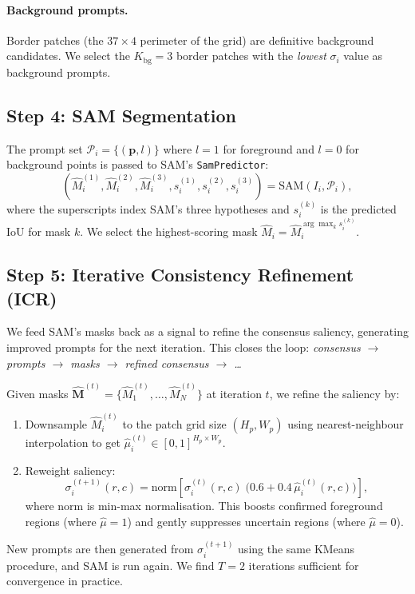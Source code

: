\documentclass[10pt,twocolumn,letterpaper]{article}
\begin{document}
\paragraph{Background prompts.}
Border patches (the $37 \times 4$ perimeter of the grid) are definitive
background candidates.
We select the $K_{\text{bg}} = 3$ border patches with the \emph{lowest}
$\sigma_i$ value as background prompts.

\subsection{Step 4: SAM Segmentation}

The prompt set $\mathcal{P}_i = \{(\mathbf{p}, l)\}$ where $l=1$ for
foreground and $l=0$ for background points is passed to SAM's
\texttt{SamPredictor}:
\begin{equation}
  (\hat{M}_i^{(1)}, \hat{M}_i^{(2)}, \hat{M}_i^{(3)}, s_i^{(1)}, s_i^{(2)}, s_i^{(3)})
  = \text{SAM}(I_i, \mathcal{P}_i),
\end{equation}
where the superscripts index SAM's three hypotheses and $s_i^{(k)}$ is the
predicted IoU for mask $k$.
We select the highest-scoring mask $\hat{M}_i = \hat{M}_i^{\arg\max_k s_i^{(k)}}$.

\subsection{Step 5: Iterative Consistency Refinement (ICR)}
\label{sec:icr}

\begin{tcolorbox}[title={\textbf{Novelty: Iterative Consistency Refinement (ICR)}}]
We feed SAM's masks back as a signal to refine the consensus saliency, generating
improved prompts for the next iteration. This closes the loop:
\emph{consensus $\to$ prompts $\to$ masks $\to$ refined consensus $\to$ \ldots}
\end{tcolorbox}

Given masks $\hat{\mathbf{M}}^{(t)} = \{\hat{M}_1^{(t)},\ldots,\hat{M}_N^{(t)}\}$
at iteration $t$, we refine the saliency by:
\begin{enumerate}
  \item Downsample $\hat{M}_i^{(t)}$ to the patch grid size $(H_p, W_p)$
        using nearest-neighbour interpolation to get
        $\hat{\mu}_i^{(t)} \in [0,1]^{H_p \times W_p}$.
  \item Reweight saliency:
    \begin{equation}
      \label{eq:icr}
      \sigma_i^{(t+1)}(r,c)
        = \text{norm}\!\left[
            \sigma_i^{(t)}(r,c)\;\bigl(0.6 + 0.4\,\hat{\mu}_i^{(t)}(r,c)\bigr)
          \right],
    \end{equation}
    where $\text{norm}$ is min-max normalisation.
    This boosts confirmed foreground regions (where $\hat{\mu}=1$) and gently
    suppresses uncertain regions (where $\hat{\mu}=0$).
\end{enumerate}
New prompts are then generated from $\sigma_i^{(t+1)}$ using the same KMeans
procedure, and SAM is run again.
We find $T=2$ iterations sufficient for convergence in practice.
\end{document}
